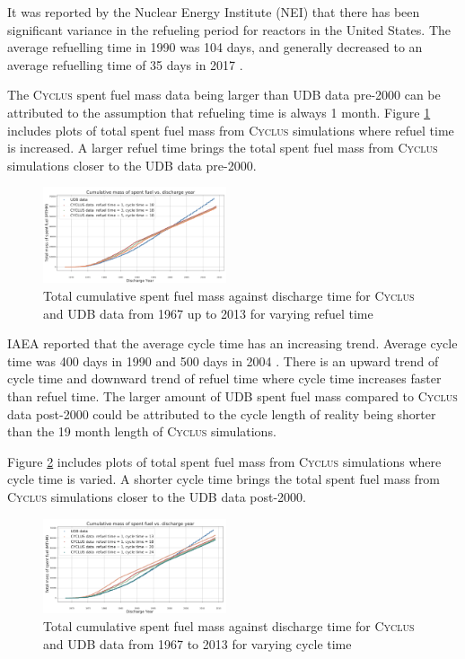 \documentclass{anstrans}
\newcommand{\Cyclus}{\textsc{Cyclus}\xspace}%
\begin{document}
It was reported by the Nuclear Energy Institute (NEI) that there has been significant variance in the refueling period for reactors in the United States. The average refuelling time in 1990 was 104 days, and generally decreased to an average refuelling time of 35 days in 2017 \cite{nei}.

The \Cyclus spent fuel mass data being larger than UDB data pre-2000 can be attributed to the assumption that refueling time is always 1 month. Figure \ref{fig:total_refueltime} includes plots of total spent fuel mass from \Cyclus simulations where refuel time is increased. A larger refuel time brings the total spent fuel mass from \Cyclus simulations closer to the UDB data pre-2000. 

\begin{figure}[ht] %
	\centering
	\includegraphics[width=0.48\textwidth]{total_cumulative_mass_spent_fuel_refueltime}
	\caption{Total cumulative spent fuel mass against discharge time for \Cyclus and UDB data from 1967 up to 2013 for varying refuel time}
	\label{fig:total_refueltime}
\end{figure} 

 IAEA reported that the average cycle time has an increasing trend. Average cycle time was 400 days in 1990 and 500 days in 2004 \cite{IAEA}. There is an upward trend of cycle time and downward trend of refuel time where cycle time increases faster than refuel time. 
The larger amount of UDB spent fuel mass compared to \Cyclus data post-2000 could be attributed to the cycle length of reality being shorter than the 19 month length of \Cyclus simulations. 

Figure \ref{fig:total_cycletime} includes plots of total spent fuel mass from \Cyclus simulations where cycle time is varied. A shorter cycle time brings the total spent fuel mass from \Cyclus simulations closer to the UDB data post-2000. 

\begin{figure}[ht] %
	\centering
	\includegraphics[width=0.48\textwidth]{total_cumulative_mass_spent_fuel_cycletime}
	\caption{Total cumulative spent fuel mass against discharge time for \Cyclus and UDB data from 1967 to 2013 for varying cycle time}
	\label{fig:total_cycletime}
\end{figure} 
\end{document}
